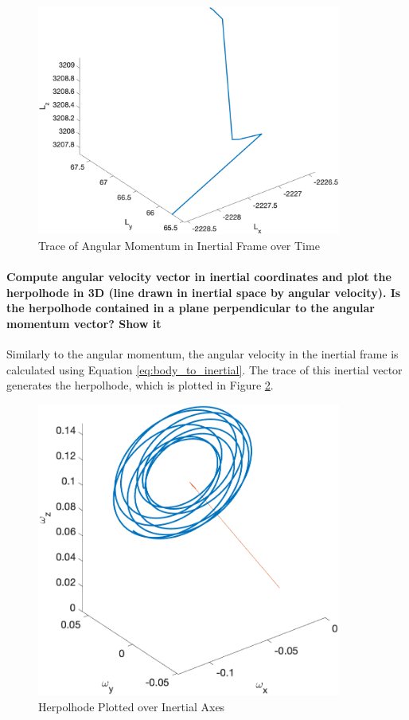 \begin{figure}[H]
    \centering
    \includegraphics[width = 10cm]{Images/angular_momentum_EA.png}
    \caption{Trace of Angular Momentum in Inertial Frame over Time}
    \label{fig:angular_momentum_trace}
\end{figure}

\paragraph{Compute angular velocity vector in inertial coordinates and plot the herpolhode in 3D (line drawn in inertial space by angular velocity). Is the herpolhode contained in a plane perpendicular to the angular momentum vector? Show it}

Similarly to the angular momentum, the angular velocity in the inertial frame is calculated using Equation \ref{eq:body_to_inertial}. The trace of this inertial vector generates the herpolhode, which is plotted in Figure \ref{fig:herpolhode}.

\begin{figure}[H]
    \centering
    \includegraphics[width = 10cm]{Images/herpolhode_EA.png}
    \caption{Herpolhode Plotted over Inertial Axes}
    \label{fig:herpolhode}
\end{figure}

